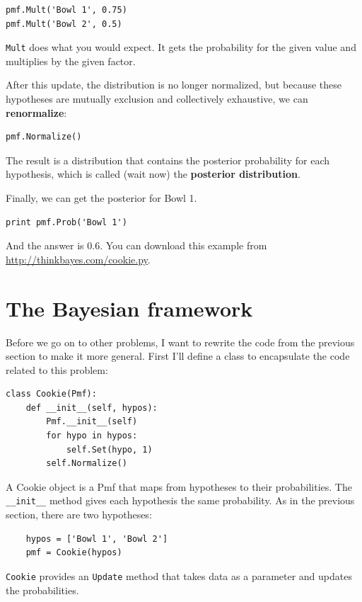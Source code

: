 \documentclass[12pt]{book}
\begin{document}
\begin{verbatim}
pmf.Mult('Bowl 1', 0.75)
pmf.Mult('Bowl 2', 0.5)
\end{verbatim}

\verb"Mult" does what you would expect.  It gets the probability
for the given value and multiplies by the given factor.

After this update, the distribution is no longer normalized, but
because these hypotheses are mutually exclusion and collectively
exhaustive, we can {\bf renormalize}:

\begin{verbatim}
pmf.Normalize()
\end{verbatim}

The result is a distribution that contains the posterior probability
for each hypothesis, which is called (wait now) the
{\bf posterior distribution}.

Finally, we can get the posterior for Bowl 1.

\begin{verbatim}
print pmf.Prob('Bowl 1')
\end{verbatim}

And the answer is 0.6.  You can download this example
from \url{http://thinkbayes.com/cookie.py}.


\section{The Bayesian framework}

Before we go on to other problems, I want to rewrite the code
from the previous section to make it more general.  First I'll
define a class to encapsulate the code related to this problem:

\begin{verbatim}
class Cookie(Pmf):
    def __init__(self, hypos):
        Pmf.__init__(self)
        for hypo in hypos:
            self.Set(hypo, 1)
        self.Normalize()
\end{verbatim}

A Cookie object is a Pmf that maps from hypotheses to their
probabilities.  The \verb"__init__" method gives each hypothesis
the same probability.  As in the previous section, there are
two hypotheses:

\begin{verbatim}
    hypos = ['Bowl 1', 'Bowl 2']
    pmf = Cookie(hypos)
\end{verbatim}

\verb"Cookie" provides an \verb"Update" method that takes
data as a parameter and updates the probabilities.
\end{document}
